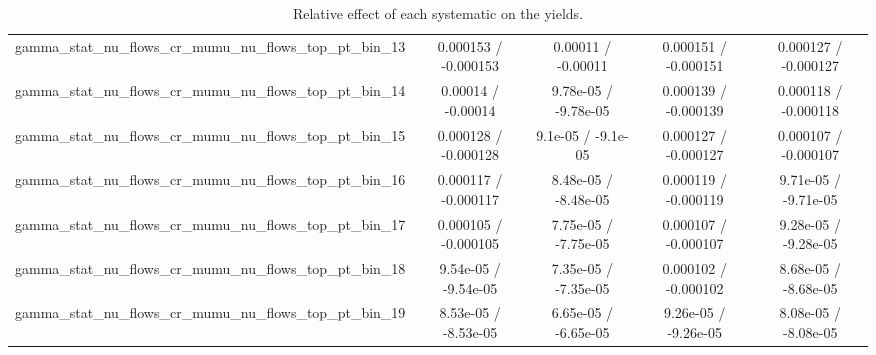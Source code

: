 \documentclass[10pt]{article}
\begin{document}
\begin{table}[htbp]
\begin{center}
\begin{tabular}{|c|c|c|c|c|}
  gamma_stat_nu_flows_cr_mumu_nu_flows_top_pt_bin_13 & 0.000153 / -0.000153 & 0.00011 / -0.00011 & 0.000151 / -0.000151 & 0.000127 / -0.000127 \\ 
  gamma_stat_nu_flows_cr_mumu_nu_flows_top_pt_bin_14 & 0.00014 / -0.00014 & 9.78e-05 / -9.78e-05 & 0.000139 / -0.000139 & 0.000118 / -0.000118 \\ 
  gamma_stat_nu_flows_cr_mumu_nu_flows_top_pt_bin_15 & 0.000128 / -0.000128 & 9.1e-05 / -9.1e-05 & 0.000127 / -0.000127 & 0.000107 / -0.000107 \\ 
  gamma_stat_nu_flows_cr_mumu_nu_flows_top_pt_bin_16 & 0.000117 / -0.000117 & 8.48e-05 / -8.48e-05 & 0.000119 / -0.000119 & 9.71e-05 / -9.71e-05 \\ 
  gamma_stat_nu_flows_cr_mumu_nu_flows_top_pt_bin_17 & 0.000105 / -0.000105 & 7.75e-05 / -7.75e-05 & 0.000107 / -0.000107 & 9.28e-05 / -9.28e-05 \\ 
  gamma_stat_nu_flows_cr_mumu_nu_flows_top_pt_bin_18 & 9.54e-05 / -9.54e-05 & 7.35e-05 / -7.35e-05 & 0.000102 / -0.000102 & 8.68e-05 / -8.68e-05 \\ 
  gamma_stat_nu_flows_cr_mumu_nu_flows_top_pt_bin_19 & 8.53e-05 / -8.53e-05 & 6.65e-05 / -6.65e-05 & 9.26e-05 / -9.26e-05 & 8.08e-05 / -8.08e-05 \\ 
\hline 
\end{tabular} 
\caption{Relative effect of each systematic on the yields.} 
\end{center} 
\end{table} 
\end{document}
